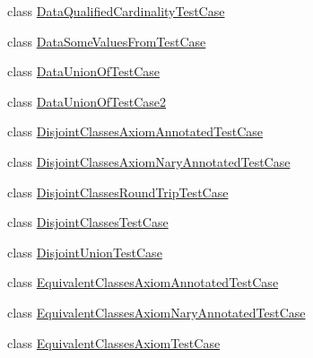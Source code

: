 \begin{DoxyCompactItemize}
\item 
class \hyperlink{classorg_1_1semanticweb_1_1owlapi_1_1api_1_1test_1_1classexpressions_1_1_data_qualified_cardinality_test_case}{Data\-Qualified\-Cardinality\-Test\-Case}
\item 
class \hyperlink{classorg_1_1semanticweb_1_1owlapi_1_1api_1_1test_1_1classexpressions_1_1_data_some_values_from_test_case}{Data\-Some\-Values\-From\-Test\-Case}
\item 
class \hyperlink{classorg_1_1semanticweb_1_1owlapi_1_1api_1_1test_1_1classexpressions_1_1_data_union_of_test_case}{Data\-Union\-Of\-Test\-Case}
\item 
class \hyperlink{classorg_1_1semanticweb_1_1owlapi_1_1api_1_1test_1_1classexpressions_1_1_data_union_of_test_case2}{Data\-Union\-Of\-Test\-Case2}
\item 
class \hyperlink{classorg_1_1semanticweb_1_1owlapi_1_1api_1_1test_1_1classexpressions_1_1_disjoint_classes_axiom_annotated_test_case}{Disjoint\-Classes\-Axiom\-Annotated\-Test\-Case}
\item 
class \hyperlink{classorg_1_1semanticweb_1_1owlapi_1_1api_1_1test_1_1classexpressions_1_1_disjoint_classes_axiom_nary_annotated_test_case}{Disjoint\-Classes\-Axiom\-Nary\-Annotated\-Test\-Case}
\item 
class \hyperlink{classorg_1_1semanticweb_1_1owlapi_1_1api_1_1test_1_1classexpressions_1_1_disjoint_classes_round_trip_test_case}{Disjoint\-Classes\-Round\-Trip\-Test\-Case}
\item 
class \hyperlink{classorg_1_1semanticweb_1_1owlapi_1_1api_1_1test_1_1classexpressions_1_1_disjoint_classes_test_case}{Disjoint\-Classes\-Test\-Case}
\item 
class \hyperlink{classorg_1_1semanticweb_1_1owlapi_1_1api_1_1test_1_1classexpressions_1_1_disjoint_union_test_case}{Disjoint\-Union\-Test\-Case}
\item 
class \hyperlink{classorg_1_1semanticweb_1_1owlapi_1_1api_1_1test_1_1classexpressions_1_1_equivalent_classes_axiom_annotated_test_case}{Equivalent\-Classes\-Axiom\-Annotated\-Test\-Case}
\item 
class \hyperlink{classorg_1_1semanticweb_1_1owlapi_1_1api_1_1test_1_1classexpressions_1_1_equivalent_classes_axiom_nary_annotated_test_case}{Equivalent\-Classes\-Axiom\-Nary\-Annotated\-Test\-Case}
\item 
class \hyperlink{classorg_1_1semanticweb_1_1owlapi_1_1api_1_1test_1_1classexpressions_1_1_equivalent_classes_axiom_test_case}{Equivalent\-Classes\-Axiom\-Test\-Case}
\item 

\end{DoxyCompactItemize}
